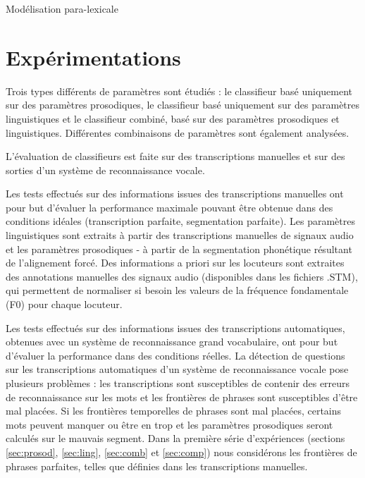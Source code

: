 \documentclass{style/these}
\begin{document}
\begin{part}{Modélisation para-lexicale}
\chapter{Expérimentations}
\renewcommand{\leftmark}{Expérimentations}

Trois types différents de paramètres sont étudiés : le classifieur basé uniquement sur des paramètres prosodiques, le  classifieur basé uniquement sur des paramètres linguistiques et le classifieur combiné, basé sur des paramètres prosodiques et linguistiques. 
Différentes combinaisons de paramètres sont également analysées. %

L'évaluation de classifieurs est faite sur des transcriptions manuelles et sur des sorties d'un système de reconnaissance vocale.

Les tests effectués sur des informations issues des transcriptions manuelles ont pour but d'évaluer la performance maximale pouvant être obtenue dans des conditions idéales (transcription parfaite, segmentation parfaite). Les paramètres linguistiques sont extraits à partir des transcriptions manuelles de signaux audio et les paramètres prosodiques - à partir de la segmentation phonétique résultant de l'alignement forcé. 
Des informations a priori sur les locuteurs sont extraites des annotations manuelles des signaux audio (disponibles dans les fichiers .STM), qui permettent de normaliser si besoin les valeurs de la fréquence fondamentale (F0) pour chaque locuteur. 

Les tests effectués sur des informations issues des transcriptions automatiques, obtenues avec un système de reconnaissance grand vocabulaire, ont pour but d'évaluer la performance dans des conditions réelles. La détection de questions sur les transcriptions automatiques d'un système de reconnaissance vocale pose plusieurs problèmes : les transcriptions sont susceptibles de contenir des erreurs de reconnaissance sur les mots et les frontières de phrases sont susceptibles d'être mal placées. 
Si les frontières temporelles de phrases sont mal placées, certains mots peuvent manquer ou être en trop et les paramètres prosodiques seront calculés sur le mauvais segment.  
Dans la première série d'expériences (sections \ref{sec:prosod}, \ref{sec:ling}, \ref{sec:comb} et \ref{sec:comp}) nous considérons les frontières de phrases parfaites, telles que définies dans les transcriptions manuelles.


\end{part}
\end{document}
